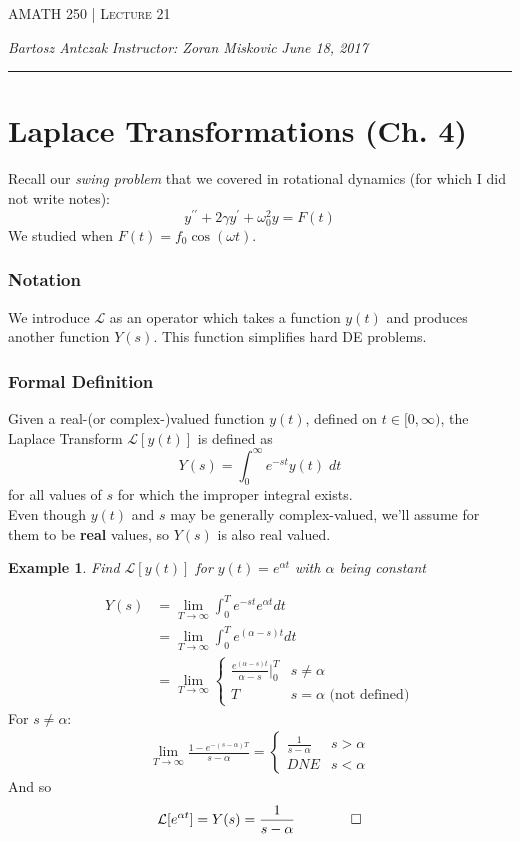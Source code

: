 \documentclass{report}
\newcommand{\lectureNum}{21}
\newcommand{\curDate}{June 18, 2017}
\newcommand{\course}{AMATH 250}
\newcommand{\instructor}{Zoran Miskovic}
\newtheorem{ex}{Example}[section]
\begin{document}
\begin{center}
\begin{Large}
\textsc{\course{} | Lecture \lectureNum{}}
\end{Large}
\end{center} 
\noindent \textit{Bartosz Antczak} \hfill
\textit{Instructor: \instructor{}} \hfill
\textit{\curDate{}}
\rule{\textwidth}{0.4pt}
\section{Laplace Transformations (Ch. 4)}
Recall our \textit{swing problem} that we covered in rotational dynamics (for which I did not write notes):
$$y^{\prime\prime} + 2\gamma y^\prime + \omega_0^2y = F(t)$$
We studied when $F(t) = f_0 \cos (\omega t)$. 
\subsubsection{Notation}
We introduce $\mathcal{L}$ as an operator which takes a function $y(t)$ and produces another function $Y(s)$. This function simplifies hard DE problems.
\subsubsection{Formal Definition}
Given a real-(or complex-)valued function $y(t)$, defined on $t \in [0, \infty)$, the Laplace Transform $\mathcal{L}[y(t)]$ is defined as
$$Y(s) = \int_0^\infty e^{-st}y(t) \; dt$$
for all values of $s$ for which the improper integral exists. \\
Even though $y(t)$ and $s$ may be generally complex-valued, we'll assume for them to be \textbf{real} values, so $Y(s)$ is also real valued.
\begin{ex}
Find $\mathcal{L}[y(t)]$ for $y(t) = e^{\alpha t}$ with $\alpha$ being constant
\end{ex}\noindent
\begin{align*}
Y(s) &= \lim_{T \to \infty} \int_0^T e^{-st}e^{\alpha t} dt \\
&= \lim_{T \to \infty} \int_0^T e^{(\alpha - s)t}dt \\
&= \lim_{T \to \infty} \begin{cases}
\frac{e^{(\alpha- s)t}}{\alpha - s}\biggl|_0^T & s \neq \alpha \\
T & s = \alpha \text{ (not defined})
\end{cases}
\end{align*}
For $s \neq \alpha$:
\begin{align*}
\lim_{T \to \infty} \frac{1 - e^{-(s - \alpha)T}}{s - \alpha} = \begin{cases}\frac{1}{s - \alpha} & s > \alpha \\ DNE & s  < \alpha\end{cases}
\end{align*}
And so 
$$\mathcal{L}[e^{\alpha t}] = Y(s) = \frac{1}{s - \alpha} \qquad \qed$$
\end{document}
